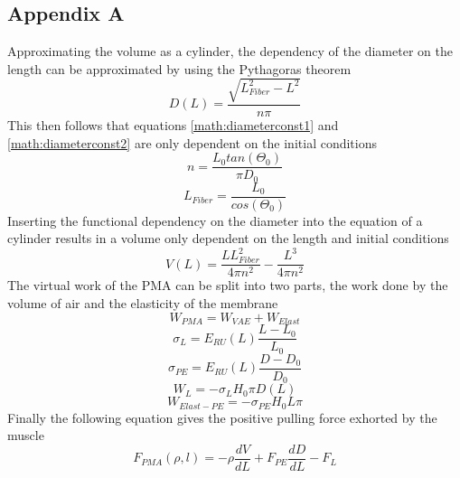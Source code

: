 \documentclass[11pt,a4paper]{article}
\begin{document}
\subsection{Appendix A}
\label{sub:staticforcederive}
Approximating the volume as a cylinder, the dependency of the diameter on the length can be approximated by using the Pythagoras theorem 
\begin{equation}
    D(L) = \frac{\sqrt{L_{Fiber}^2-L^2}}{n \pi}
\end{equation}
This then follows that equations \ref{math:diameterconst1} and \ref{math:diameterconst2} are only dependent on the initial conditions
\begin{equation}
    n = \frac{L_0tan(\Theta_0)}{\pi D_0}
    \label{math:diameterconst1}
\end{equation}
\begin{equation}
    L_{Fiber} = \frac{L_0}{cos(\Theta_0)}
    \label{math:diameterconst2}
\end{equation}
Inserting the functional dependency on the diameter into the equation of a cylinder results in a volume only dependent on the length and initial conditions
\begin{equation}
    V(L) = \frac{L L_{Fiber}^2}{4 \pi n^2}-\frac{L^3}{4 \pi n^2}
\end{equation}
The virtual work of the PMA can be split into two parts, the work done by the volume of air and the elasticity of the membrane 
\begin{equation}
    W_{PMA} = W_{VAE} + W_{Elast}
\end{equation}
\begin{equation}
    \sigma_{L} = E_{RU}(L) \frac{L-L_0}{L_0}
\end{equation}
\begin{equation}
    \sigma_{PE} = E_{RU}(L) \frac{D-D_0}{D_0}
\end{equation}
\begin{equation}
    W_{L} = -\sigma_{L} H_0 \pi D(L)
\end{equation}
\begin{equation}
    W_{Elast-PE} = -\sigma_{PE} H_0 L \pi
\end{equation}
Finally the following equation gives the positive pulling force exhorted by the muscle
\begin{equation}
    F_{PMA}(\rho, l) = -\rho \frac{dV}{dL}+F_{PE} \frac{dD}{dL}-F_L
    \label{math:staticforcederive}
\end{equation}

\newpage

\printbibliography
\end{document}
